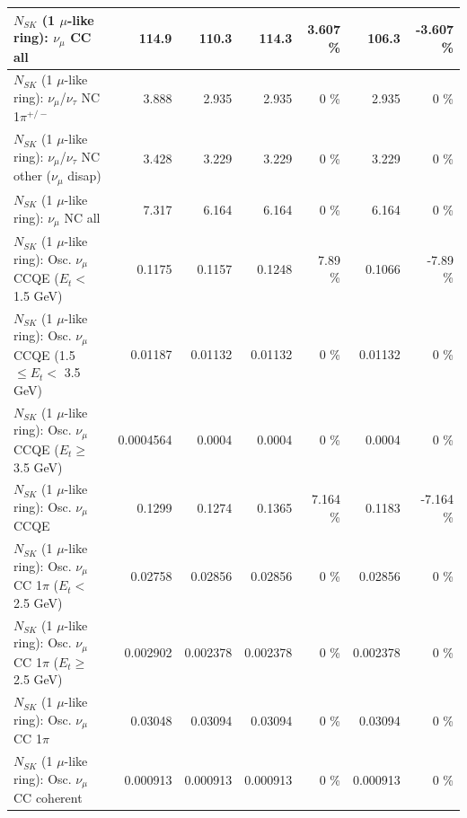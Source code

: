 \begin{table}
\begin{tabular}{| l | r | r | r  r | r  r |}
                                $N_{SK}$ (1 $\mu$-like ring): $\nu_{\mu}$ CC all &           114.9 &           110.3 &           114.3 &    3.607 \%  &           106.3 &   -3.607 \%  \\ 
\hline
              $N_{SK}$ (1 $\mu$-like ring): $\nu_\mu$/$\nu_\tau$ NC 1$\pi^{+/-}$ &           3.888 &           2.935 &           2.935 &        0 \%  &           2.935 &        0 \%  \\ 
   $N_{SK}$ (1 $\mu$-like ring): $\nu_\mu$/$\nu_\tau$ NC other ($\nu_\mu$ disap) &           3.428 &           3.229 &           3.229 &        0 \%  &           3.229 &        0 \%  \\ 
                                $N_{SK}$ (1 $\mu$-like ring): $\nu_{\mu}$ NC all &           7.317 &           6.164 &           6.164 &        0 \%  &           6.164 &        0 \%  \\ 
\hline
\hline
           $N_{SK}$ (1 $\mu$-like ring): Osc. $\nu_\mu$ CCQE ($E_{t} <$ 1.5 GeV) &          0.1175 &          0.1157 &          0.1248 &     7.89 \%  &          0.1066 &    -7.89 \%  \\ 
  $N_{SK}$ (1 $\mu$-like ring): Osc. $\nu_\mu$ CCQE (1.5 $\leq E_{t} <$ 3.5 GeV) &         0.01187 &         0.01132 &         0.01132 &        0 \%  &         0.01132 &        0 \%  \\ 
        $N_{SK}$ (1 $\mu$-like ring): Osc. $\nu_\mu$ CCQE ($E_{t} \geq$ 3.5 GeV) &       0.0004564 &          0.0004 &          0.0004 &        0 \%  &          0.0004 &        0 \%  \\ 
\hline
                               $N_{SK}$ (1 $\mu$-like ring): Osc. $\nu_\mu$ CCQE &          0.1299 &          0.1274 &          0.1365 &    7.164 \%  &          0.1183 &   -7.164 \%  \\ 
\hline
      $N_{SK}$ (1 $\mu$-like ring): Osc. $\nu_\mu$ CC 1$\pi$ ($E_{t} <$ 2.5 GeV) &         0.02758 &         0.02856 &         0.02856 &        0 \%  &         0.02856 &        0 \%  \\ 
   $N_{SK}$ (1 $\mu$-like ring): Osc. $\nu_\mu$ CC 1$\pi$ ($E_{t} \geq$ 2.5 GeV) &        0.002902 &        0.002378 &        0.002378 &        0 \%  &        0.002378 &        0 \%  \\ 
\hline
                          $N_{SK}$ (1 $\mu$-like ring): Osc. $\nu_\mu$ CC 1$\pi$ &         0.03048 &         0.03094 &         0.03094 &        0 \%  &         0.03094 &        0 \%  \\ 
                        $N_{SK}$ (1 $\mu$-like ring): Osc. $\nu_\mu$ CC coherent &        0.000913 &        0.000913 &        0.000913 &        0 \%  &        0.000913 &        0 \%  \\ 

\end{tabular}
\end{table}
